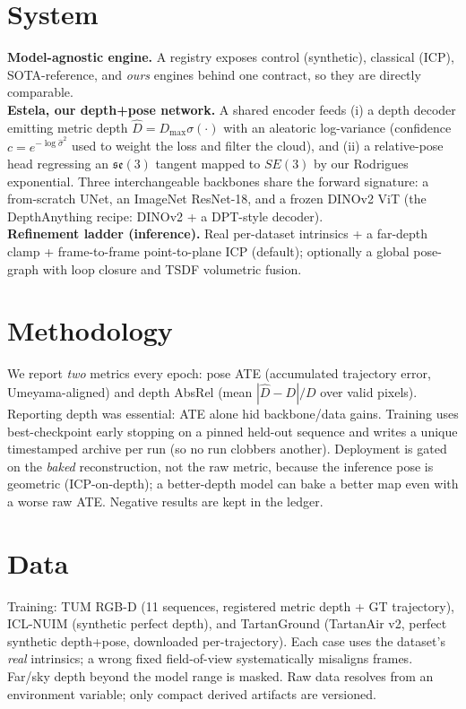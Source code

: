 \documentclass[10pt,twocolumn]{article}
\begin{document}
\section{System}
\textbf{Model-agnostic engine.} A registry exposes control (synthetic), classical (ICP), SOTA-reference, and
\emph{ours} engines behind one contract, so they are directly comparable. \\
\textbf{Estela, our depth+pose network.} A shared encoder feeds (i) a depth decoder emitting metric depth
$\hat D = D_{\max}\sigma(\cdot)$ with an aleatoric log-variance (confidence $c=e^{-\log\hat\sigma^2}$ used to weight
the loss and filter the cloud), and (ii) a relative-pose head regressing an $\mathfrak{se}(3)$ tangent mapped to
$SE(3)$ by our Rodrigues exponential. Three interchangeable backbones share the forward signature: a from-scratch
UNet, an ImageNet ResNet-18, and a frozen DINOv2 ViT (the DepthAnything recipe: DINOv2 + a DPT-style decoder). \\
\textbf{Refinement ladder (inference).} Real per-dataset intrinsics + a far-depth clamp + frame-to-frame
point-to-plane ICP (default); optionally a global pose-graph with loop closure and TSDF volumetric fusion.

\section{Methodology}
We report \emph{two} metrics every epoch: pose ATE (accumulated trajectory error, Umeyama-aligned) and depth AbsRel
(mean $|\hat D - D|/D$ over valid pixels). Reporting depth was essential: ATE alone hid backbone/data gains.
Training uses best-checkpoint early stopping on a pinned held-out sequence and writes a unique timestamped archive
per run (so no run clobbers another). Deployment is gated on the \emph{baked} reconstruction, not the raw metric,
because the inference pose is geometric (ICP-on-depth); a better-depth model can bake a better map even with a worse
raw ATE. Negative results are kept in the ledger.

\section{Data}
Training: TUM RGB-D (11 sequences, registered metric depth + GT trajectory), ICL-NUIM (synthetic perfect depth), and
TartanGround (TartanAir v2, perfect synthetic depth+pose, downloaded per-trajectory). Each case uses the dataset's
\emph{real} intrinsics; a wrong fixed field-of-view systematically misaligns frames. Far/sky depth beyond the model
range is masked. Raw data resolves from an environment variable; only compact derived artifacts are versioned.
\end{document}
